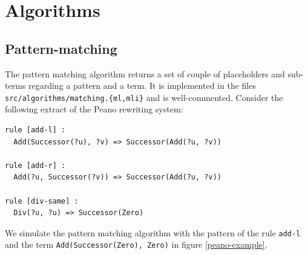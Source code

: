 \documentclass[12pt,a4paper]{article}
\begin{document}
\section{Algorithms}
\label{algorithms}

\subsection{Pattern-matching}
\label{pattern-matching}

The pattern matching algorithm returns a set of couple of placeholders and sub-terms regarding a pattern and a term. It is implemented in the files \texttt{src/algorithms/matching.\{ml,mli\}} and is well-commented. Consider the following extract of the Peano rewriting system:
\begin{lstlisting}
rule [add-l] :
  Add(Successor(?u), ?v) => Successor(Add(?u, ?v))

rule [add-r] :
  Add(?u, Successor(?v)) => Successor(Add(?u, ?v))

rule [div-same] :
  Div(?u, ?u) => Successor(Zero)
\end{lstlisting}

We simulate the pattern matching algorithm with the pattern of the rule \texttt{add-l} and the term \texttt{Add(Successor(Zero), Zero)} in figure \ref{peano-example}.
\end{document}
